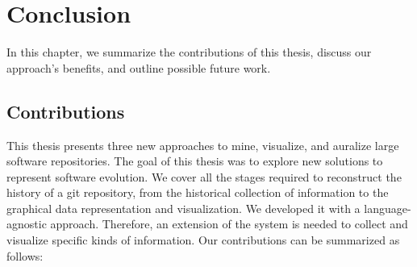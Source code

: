 \chapter{Conclusion}
In this chapter, we summarize the contributions of this thesis, discuss our approach's benefits, and outline possible future work.

\section{Contributions}
This thesis presents three new approaches to mine, visualize, and auralize large software repositories. The goal of this thesis was to explore new solutions to represent software evolution. We cover all the stages required to reconstruct the history of a git repository, from the historical collection of information to the graphical data representation and visualization. We developed it with a language-agnostic approach. Therefore, an extension of the system is needed to collect and visualize specific kinds of information. Our contributions can be summarized as follows:
